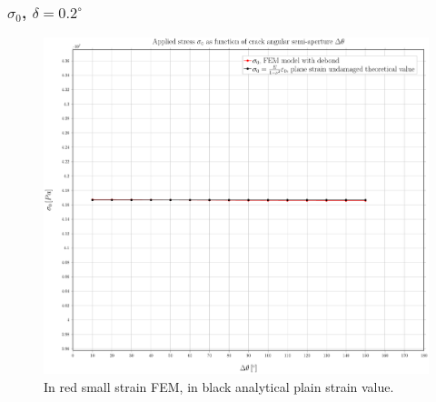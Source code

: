 \documentclass[first,firstsupp,lastsupp,handout,last,hyperref,table]{ETHclass}
\begin{document}
\begin{frame}
\frametitle{\small $\sigma_{0}$, $\delta=0.2^{\circ}$}
\vspace{-0.5cm}
\centering
\captionsetup[figure]{font=scriptsize,labelfont=scriptsize}
\begin{figure}[!h]
\centering
\includegraphics[height=0.7\textheight]{2017-07-10_AbqRunSummary_SmallStrainD02_sigma-inf_Summary.pdf}
  \caption{\scriptsize In red small strain FEM, in black analytical plain strain value.}
  \label{fig:res1}
\end{figure}
\end{frame}
\end{document}
